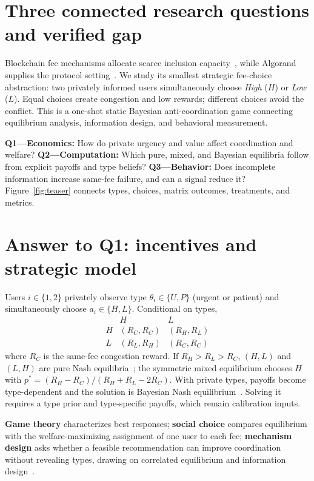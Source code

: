 \section{Three connected research questions and verified gap}
Blockchain fee mechanisms allocate scarce inclusion capacity~\cite{roughgarden2024}, while Algorand supplies the protocol setting~\cite{gilad2017}. We study its smallest strategic fee-choice abstraction: two privately informed users simultaneously choose \emph{High} ($H$) or \emph{Low} ($L$). Equal choices create congestion and low rewards; different choices avoid the conflict. This is a one-shot static Bayesian anti-coordination game connecting equilibrium analysis, information design, and behavioral measurement.

\textbf{Q1---Economics:} How do private urgency and value affect coordination and welfare? \textbf{Q2---Computation:} Which pure, mixed, and Bayesian equilibria follow from explicit payoffs and type beliefs? \textbf{Q3---Behavior:} Does incomplete information increase same-fee failure, and can a signal reduce it? Figure~\ref{fig:teaser} connects types, choices, matrix outcomes, treatments, and metrics.

\section{Answer to Q1: incentives and strategic model}
Users $i\in\{1,2\}$ privately observe type $\theta_i\in\{U,P\}$ (urgent or patient) and simultaneously choose $a_i\in\{H,L\}$. Conditional on types,
\[
\begin{array}{c|cc}&H&L\\\hline H&(R_C,R_C)&(R_H,R_L)\\L&(R_L,R_H)&(R_C,R_C)\end{array}
\]
where $R_C$ is the same-fee congestion reward. If $R_H>R_L>R_C$, $(H,L)$ and $(L,H)$ are pure Nash equilibria~\cite{nash1950}; the symmetric mixed equilibrium chooses $H$ with $p^*=(R_H-R_C)/(R_H+R_L-2R_C)$. With private types, payoffs become type-dependent and the solution is Bayesian Nash equilibrium~\cite{harsanyi1968}. Solving it requires a type prior and type-specific payoffs, which remain calibration inputs.

\textbf{Game theory} characterizes best responses; \textbf{social choice} compares equilibrium with the welfare-maximizing assignment of one user to each fee; \textbf{mechanism design} asks whether a feasible recommendation can improve coordination without revealing types, drawing on correlated equilibrium and information design~\cite{aumann1974,bergemann2016}.


